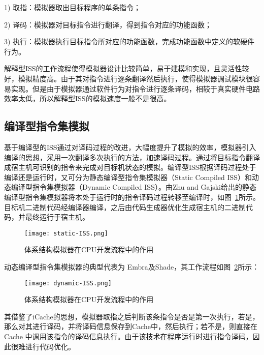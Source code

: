 1) 取指：模拟器取出目标程序的单条指令；


2) 译码：模拟器对目标指令进行翻译，得到指令对应的功能函数； 


3) 执行：模拟器执行目标指令所对应的功能函数，完成功能函数中定义的软硬件行为。


解释型ISS的工作流程使得模拟器设计比较简单，易于建模和实现，且灵活性较好，模拟精度高。由于其对指令进行逐条翻译然后执行，使得模拟器调试模块很容易实现。但是由于模拟器通过软件行为对指令进行逐条译码，相较于真实硬件电路效率太低\cite{gutierrez2014sources}，所以解释型ISS的模拟速度一般不是很高。


\subsection{编译型指令集模拟}
基于编译型的ISS通过对译码过程的改进，大幅度提升了模拟的效率，模拟器引入编译的思想，采用一次翻译多次执行的方法，加速译码过程\cite{李剑慧2007动态二进制翻译与优化技术研究}。通过将目标指令翻译成宿主机可识别的指令来完成对目标机状态的模拟。编译型ISS根据译码过程处于编译还是运行时，又可分为静态编译型指令集模拟器（Static Compiled ISS）和动态编译型指令集模拟器（Dynamic Compiled ISS）。由Zhu and Gajski\cite{zhu1999retargetable}给出的静态编译型指令集模拟器将本处于运行时的指令译码过程转移至编译时，如图~\ref{fig:static-ISS}所示。目标机二进制代码经编译器编译，之后由代码生成器优化生成宿主机的二进制代码，并最终运行于宿主机。
\begin{figure}[h]
  \centering
  \texttt{[image: static-ISS.png]}
  \caption{体系结构模拟器在CPU开发流程中的作用}
  \label{fig:static-ISS}
\end{figure}


动态编译型指令集模拟器的典型代表为 Embra\cite{witchel1996embra}及Shade\cite{cmelik1995shade}，其工作流程如图~\ref{fig:dynamic-ISS}所示：
\begin{figure}[h]
  \centering
  \texttt{[image: dynamic-ISS.png]}
  \caption{体系结构模拟器在CPU开发流程中的作用}
  \label{fig:dynamic-ISS}
\end{figure}


其借鉴了iCache的思想，模拟器取指之后判断该条指令是否是第一次执行，若是，那么对其进行译码，并将译码信息保存到Cache中，然后执行；若不是，则直接在 Cache 中调用该指令的译码信息执行。由于该技术在程序运行时进行指令译码，因此很难进行代码优化。

